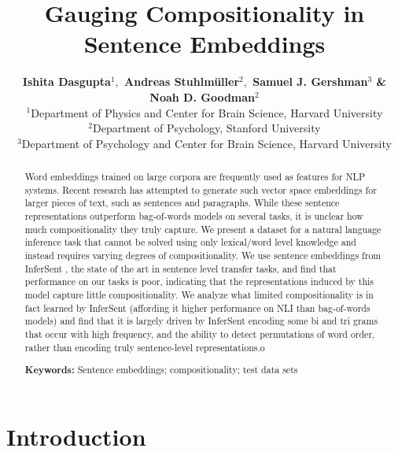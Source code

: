 \documentclass[10pt,letterpaper]{article}
\title{Gauging Compositionality in Sentence Embeddings}
\author{\textbf{Ishita Dasgupta$^1,$ Andreas Stuhlm\"uller$^2,$ Samuel J. Gershman$^3$ \& Noah D. Goodman$^2$}\medskip\\ 
$^1$Department of Physics and Center for Brain Science, Harvard University\\
$^2$Department of Psychology, Stanford University\\
$^3$Department of Psychology and Center for Brain Science, Harvard University
}
\begin{document}
\maketitle


\begin{abstract}
Word embeddings trained on large corpora are frequently used as features for NLP systems. Recent research has attempted to generate such vector space embeddings for larger pieces of text, such as sentences and paragraphs. While these sentence representations outperform bag-of-words models on several tasks, it is unclear how much compositionality they truly capture. We present a dataset for a natural language inference task that cannot be solved using only lexical/word level knowledge and instead requires varying degrees of compositionality. We use sentence embeddings from InferSent \citep{Conneau:2017uf}, the state of the art in sentence level transfer tasks, and find that performance on our tasks is poor, indicating that the representations induced by this model capture little compositionality. We analyze what limited compositionality is in fact learned by InferSent (affording it higher performance on NLI than bag-of-words models) and find that it is largely driven by InferSent encoding some bi and tri grams that occur with high frequency, and the ability to detect permutations of word order, rather than encoding truly sentence-level representations.o

\textbf{Keywords:} 
Sentence embeddings; compositionality; test data sets
\end{abstract}


\section{Introduction}
\end{document}
